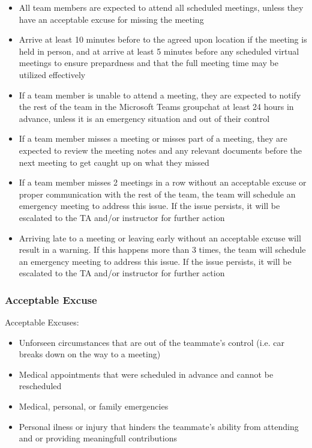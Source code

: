 \documentclass{article}
\begin{document}
\begin{itemize}
    \item All team members are expected to attend all scheduled meetings, unless they 
    have an acceptable excuse for missing the meeting
    \item Arrive at least 10 minutes before to the agreed upon location if the 
    meeting is held in person, and at arrive at least 5 minutes before any scheduled 
    virtual meetings to ensure prepardness and that the full meeting time may be 
    utilized effectively
    \item If a team member is unable to attend a meeting, they are expected to notify 
    the rest of the team in the Microsoft Teams groupchat at least 24 hours in advance, unless it is an emergency situation 
    and out of their control
    \item If a team member misses a meeting or misses part of a meeting, they are expected 
    to review the meeting notes and any relevant documents before the next meeting 
    to get caught up on what they missed
    \item If a team member misses 2 meetings in a row without an acceptable excuse or 
    proper communication with the rest of the team, the team will schedule an
    emergency meeting to address this issue. If the issue persists, it will be escalated to the 
    TA and/or instructor for further action
    \item Arriving late to a meeting or leaving early without an acceptable excuse will 
    result in a warning. If this happens more than 3 times, the team will schedule an 
    emergency meeting to address this issue. If the issue persists, it will be escalated to the 
    TA and/or instructor for further action
\end{itemize}


\subsubsection*{Acceptable Excuse}

Acceptable Excuses:

\begin{itemize}
    \item Unforseen circumstances that are out of the teammate's control (i.e. 
    car breaks down on the way to a meeting)
    \item Medical appointments that were scheduled in advance and cannot be rescheduled
    \item Medical, personal, or family emergencies
    \item Personal ilness or injury that hinders the teammate's ability from attending
    and or providing meaningfull contributions
\end{itemize}
\end{document}
